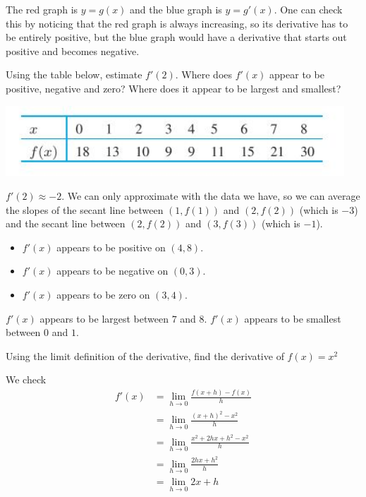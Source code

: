\documentclass[11pt]{exam}
\begin{document}
\begin{questions}
    \begin{solution}
      The red graph is \(y=g(x)\) and the blue graph is
      \(y=g'(x)\). One can check this by noticing that the red graph
      is always increasing, so its derivative has to be entirely
      positive, but the blue graph would have a derivative that starts
      out positive and becomes negative. 
    \end{solution}
  \question Using the table below, estimate $f'(2)$.  Where does $f'(x)$ appear to be positive, negative and zero?  Where does it appear to be largest and smallest?

    \includegraphics[width=5in]{table.jpg}	
    \begin{solution}
      \(f'(2) \approx -2\). We can only approximate with the data we
      have, so we can average the slopes of the secant line between
      \((1,f(1))\) and \((2,f(2))\) (which is \(-3\)) and the secant
      line between \((2,f(2))\) and \((3,f(3))\) (which is \(-1\)). 
      \begin{itemize}
      \item \(f'(x)\) appears to be positive on
        \((4,8)\).
      \item \(f'(x)\) appears to be negative on \((0,3)\).
      \item \(f'(x)\) appears to be zero on \((3,4)\).
      \end{itemize}
      \(f'(x)\) appears to be largest between \(7\) and
      \(8\). \(f'(x)\) appears to be smallest between \(0\) and \(1\).
    \end{solution}
  \question Using the limit definition of the derivative, find the
    derivative of \(f(x) = x^2\)
    \begin{solution}
      We check
      \begin{align*}
        f'(x)
        & = \lim_{h \to 0} \frac{f(x+h)-f(x)}{h}\\
        & = \lim_{h \to 0} \frac{(x+h)^2-x^2}{h}\\
        & = \lim_{h \to 0} \frac{x^2+2hx+h^2-x^2}{h}\\
        & = \lim_{h \to 0} \frac{2hx+h^2}{h}\\
        & = \lim_{h \to 0} 2x+h\\

\end{align*}
\end{solution}
\end{questions}
\end{document}

